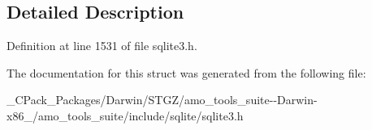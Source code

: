 \subsection{Detailed Description}


Definition at line 1531 of file sqlite3.\+h.



The documentation for this struct was generated from the following file\+:\begin{DoxyCompactItemize}
\item 
\+\_\+\+C\+Pack\+\_\+\+Packages/\+Darwin/\+S\+T\+G\+Z/amo\+\_\+tools\+\_\+suite-\/-\/\+Darwin-\/x86\+\_/amo\+\_\+tools\+\_\+suite/include/sqlite/sqlite3.\+h\end{DoxyCompactItemize}
